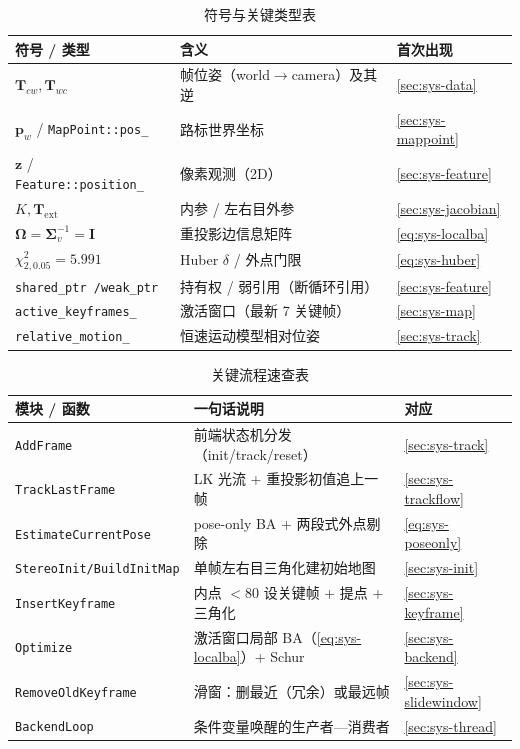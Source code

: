 \begin{table}[H]\centering\small
\caption{符号与关键类型表}
\begin{tabular}{lll}
\toprule
符号 / 类型 & 含义 & 首次出现 \\
\midrule
$\mathbf{T}_{cw},\mathbf{T}_{wc}$ & 帧位姿（world$\to$camera）及其逆 & \cref{sec:sys-data} \\
$\mathbf{p}_w$ / \texttt{MapPoint::pos\_} & 路标世界坐标 & \cref{sec:sys-mappoint} \\
$\mathbf{z}$ / \texttt{Feature::position\_} & 像素观测（2D） & \cref{sec:sys-feature} \\
$K,\mathbf{T}_{\mathrm{ext}}$ & 内参 / 左右目外参 & \cref{sec:sys-jacobian} \\
$\boldsymbol\Omega=\boldsymbol\Sigma_v^{-1}=\mathbf{I}$ & 重投影边信息矩阵 & \cref{eq:sys-localba} \\
$\chi^2_{2,0.05}=5.991$ & Huber $\delta$ / 外点门限 & \cref{eq:sys-huber} \\
\texttt{shared\_ptr /\allowbreak  weak\_ptr} & 持有权 / 弱引用（断循环引用） & \cref{sec:sys-feature} \\
\texttt{active\_keyframes\_} & 激活窗口（最新 7 关键帧） & \cref{sec:sys-map} \\
\texttt{relative\_motion\_} & 恒速运动模型相对位姿 & \cref{sec:sys-track} \\
\bottomrule
\end{tabular}
\end{table}

\begin{table}[H]\centering\small
\caption{关键流程速查表}
\begin{tabular}{lll}
\toprule
模块 / 函数 & 一句话说明 & 对应 \\
\midrule
\texttt{AddFrame} & 前端状态机分发（init/track/reset） & \cref{sec:sys-track} \\
\texttt{TrackLastFrame} & LK 光流 + 重投影初值追上一帧 & \cref{sec:sys-trackflow} \\
\texttt{EstimateCurrentPose} & pose-only BA + 两段式外点剔除 & \cref{eq:sys-poseonly} \\
\texttt{StereoInit/\allowbreak BuildInitMap} & 单帧左右目三角化建初始地图 & \cref{sec:sys-init} \\
\texttt{InsertKeyframe} & 内点 $<80$ 设关键帧 + 提点 + 三角化 & \cref{sec:sys-keyframe} \\
\texttt{Optimize} & 激活窗口局部 BA（\cref{eq:sys-localba}）+ Schur & \cref{sec:sys-backend} \\
\texttt{RemoveOldKeyframe} & 滑窗：删最近（冗余）或最远帧 & \cref{sec:sys-slidewindow} \\
\texttt{BackendLoop} & 条件变量唤醒的生产者—消费者 & \cref{sec:sys-thread} \\
\bottomrule
\end{tabular}
\end{table}

